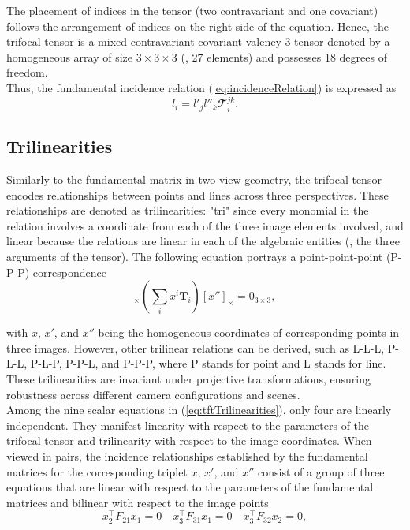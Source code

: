The placement of indices in the tensor (two contravariant and one covariant) follows the arrangement of indices on the right side of the equation. Hence, the trifocal tensor is a mixed contravariant-covariant valency 3 tensor denoted by a homogeneous array of size \( 3 \times 3 \times 3 \) (\ie, 27 elements) and possesses 18 degrees of freedom.\\

Thus, the fundamental incidence relation (\ref{eq:incidenceRelation}) is expressed as
\begin{equation}
	l_i = l'_jl''_k\mathbfcal{T}_i^{jk}.
	\label{eq:incidenceRelationTensor}
\end{equation}

\subsection{Trilinearities}\label{sec:trilinearities}
Similarly to the fundamental matrix in two-view geometry, the trifocal tensor encodes relationships between points and lines across three perspectives. These relationships are denoted as trilinearities: "tri" since every monomial in the relation involves a coordinate from each of the three image elements involved, and linear because the relations are linear in each of the algebraic entities (\ie, the three arguments of the tensor). The following equation portrays a point-point-point (P-P-P) correspondence 
\begin{equation}
	[x']_{\times} \left( \sum_{i}x^i\bm{T}_i \right) [x'']_{\times} = 0_{3 \times 3},
	\label{eq:tftTrilinearities}
\end{equation}

with \( x \), \( x' \), and \( x'' \) being the homogeneous coordinates of corresponding points in three images. However, other trilinear relations can be derived, such as L-L-L, P-L-L, P-L-P, P-P-L, and P-P-P, where P stands for point and L stands for line. These trilinearities are invariant under projective transformations, ensuring robustness across different camera configurations and scenes.\\

Among the nine scalar equations in (\ref{eq:tftTrilinearities}), only four are linearly independent. They manifest linearity with respect to the parameters of the trifocal tensor and trilinearity with respect to the image coordinates. When viewed in pairs, the incidence relationships established by the fundamental matrices for the corresponding triplet \( x \), \( x' \), and \( x'' \) consist of a group of three equations that are linear with respect to the parameters of the fundamental matrices and bilinear with respect to the image points
\begin{equation}
	x_2^\top F_{21}x_1 = 0 \quad x_3^\top F_{31}x_1 = 0 \quad x_3^\top F_{32}x_2 = 0,
\end{equation}

